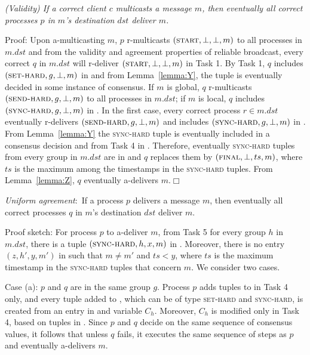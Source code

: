 \vspace{2mm}
\setcounter{proposition}{1}
\begin{proposition}
\textit{(Validity) If a correct client $c$ multicasts a message $m$, then eventually all correct processes $p$ in $m$'s destination $dst$ deliver $m$.}
\end{proposition}
\noindent
{\sc Proof:} 
Upon a-multicasting $m$, $p$ r-multicasts $(\textsc{start}, \bot, \bot, m)$ to all processes in $m.dst$ and from the validity and agreement properties of reliable broadcast, every correct $q$ in $m.dst$ will r-deliver $(\textsc{start}, \bot, \bot, m)$ in Task 1.
By Task 1, $q$ includes $(\textsc{set-hard}, g, \bot, m)$ in \Pend and from Lemma~\ref{lemma:Y}, the tuple is eventually decided in some instance of consensus.
If $m$ is global, $q$ r-multicasts $(\textsc{send-hard}, g, \bot, m)$ to all processes in $m.dst$; if $m$ is local, $q$ includes $(\textsc{sync-hard}, g, \bot, m)$ in \Buffer.
In the first case, every correct process $r \in m.dst$ eventually r-delivers $(\textsc{send-hard}, g, \bot, m)$ and includes $(\textsc{sync-hard}, g, \bot, m)$  in \Pend.
From Lemma~\ref{lemma:Y} the \textsc{sync-hard} tuple is eventually included in a consensus decision and from Task 4 in \Buffer.
Therefore, eventually \textsc{sync-hard} tuples from every group in $m.dst$ are in \Buffer and $q$ replaces them by $(\textsc{final}, \bot, ts, m)$, where $ts$ is the maximum among the timestamps in the \textsc{sync-hard} tuples.
From Lemma~\ref{lemma:Z}, $q$ eventually a-delivers $m$.\hfill$\Box$


\setcounter{proposition}{4}
\begin{proposition}
\textit{Uniform agreement}:~If a process $p$ delivers a message $m$, then eventually all correct processes $q$ in $m$'s destination $dst$ deliver $m$.
\end{proposition}
\noindent
{\sc Proof sketch:} 
For process $p$ to a-deliver $m$, from Task 5 for every group $h$ in $m.dst$, there is a tuple $(\textsc{sync-hard}, h, x, m)$ in \Buffer.
Moreover, there is no entry $(z, h', y, m')$ in \Buffer such that $m \neq m'$ and $ts < y$, where $ts$ is the maximum timestamp in the \textsc{sync-hard} tuples that concern $m$.
We consider two cases.

Case (a): $p$ and $q$ are in the same group $g$.
Process $p$ adds tuples to \Buffer in Task 4 only, and every tuple added to \Buffer, which can be of type \textsc{set-hard} and \textsc{sync-hard}, is created from an entry in \Decided and variable $C_h$.
Moreover, $C_h$ is modified only in Task 4, based on tuples in \Decided.
Since $p$ and $q$ decide on the same sequence of consensus values, it follows that unless $q$ fails, it executes the same sequence of steps as $p$ and eventually a-delivers $m$.

